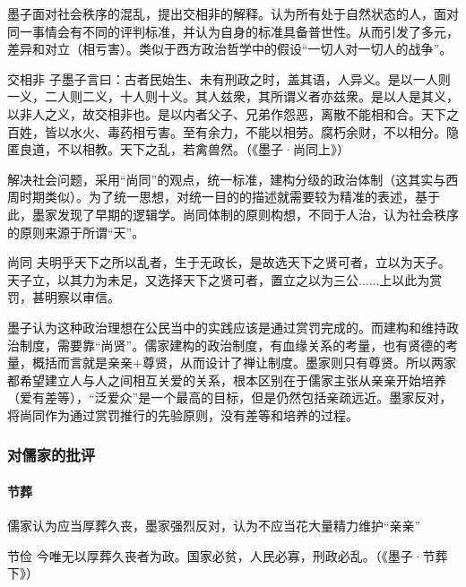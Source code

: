 \documentclass{ctexart}
\begin{document}
墨子面对社会秩序的混乱，提出交相非的解释。认为所有处于自然状态的人，面对同一事情会有不同的评判标准，并认为自身的标准具备普世性。从而引发了多元，差异和对立（相亏害）。类似于西方政治哲学中的假设“一切人对一切人的战争”。

\begin{fancybox}{交相非}
    子墨子言曰：古者民始生、未有刑政之时，盖其语，人异义。是以一人则一义，二人则二义，十人则十义。其人兹衆，其所谓义者亦兹衆。是以人是其义，以非人之义，故交相非也。是以内者父子、兄弟作怨恶，离散不能相和合。天下之百姓，皆以水火、毒药相亏害。至有余力，不能以相劳。腐朽余财，不以相分。隐匿良道，不以相教。天下之乱，若禽兽然。（《墨子·尚同上》）
\end{fancybox}

解决社会问题，采用“尚同”的观点，统一标准，建构分级的政治体制（这其实与西周时期类似）。为了统一思想，对统一目的的描述就需要较为精准的表述，基于此，墨家发现了早期的逻辑学。尚同体制的原则构想，不同于人治，认为社会秩序的原则来源于所谓“天”。

\begin{fancybox}{尚同}
    夫明乎天下之所以乱者，生于无政长，是故选天下之贤可者，立以为天子。天子立，以其力为未足，又选择天下之贤可者，置立之以为三公......上以此为赏罚，甚明察以审信。
\end{fancybox}

墨子认为这种政治理想在公民当中的实践应该是通过赏罚完成的。而建构和维持政治制度，需要靠“尚贤”。儒家建构的政治制度，有血缘关系的考量，也有贤德的考量，概括而言就是亲亲+尊贤，从而设计了禅让制度。墨家则只有尊贤。所以两家都希望建立人与人之间相互关爱的关系，根本区别在于儒家主张从亲亲开始培养（爱有差等），“泛爱众”是一个最高的目标，但是仍然包括亲疏远近。墨家反对，将尚同作为通过赏罚推行的先验原则，没有差等和培养的过程。

\subsubsection{对儒家的批评}

\paragraph{节葬}

儒家认为应当厚葬久丧，墨家强烈反对，认为不应当花大量精力维护“亲亲”

\begin{fancybox}{节俭}
    今唯无以厚葬久丧者为政。国家必贫，人民必寡，刑政必乱。（《墨子·节葬下》）
\end{fancybox}
\end{document}
